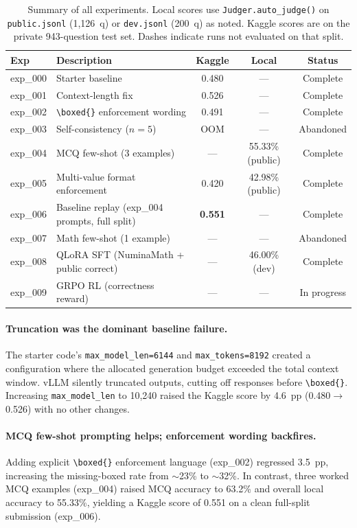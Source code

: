 \documentclass{article}
\begin{document}
\begin{table}[h]
  \caption{Summary of all experiments. Local scores use \texttt{Judger.auto\_judge()} on \texttt{public.jsonl} (1,126~q) or \texttt{dev.jsonl} (200~q) as noted. Kaggle scores are on the private 943-question test set. Dashes indicate runs not evaluated on that split.}
  \label{tab:results}
  \centering
  \begin{tabular}{llccc}
    \toprule
    Exp & Description & Kaggle & Local & Status \\
    \midrule
    exp\_000 & Starter baseline & 0.480 & --- & Complete \\
    exp\_001 & Context-length fix & 0.526 & --- & Complete \\
    exp\_002 & \verb|\boxed{}| enforcement wording & 0.491 & --- & Complete \\
    exp\_003 & Self-consistency ($n{=}5$) & OOM & --- & Abandoned \\
    exp\_004 & MCQ few-shot (3 examples) & --- & 55.33\% (public) & Complete \\
    exp\_005 & Multi-value format enforcement & 0.420 & 42.98\% (public) & Complete \\
    exp\_006 & Baseline replay (exp\_004 prompts, full split) & \textbf{0.551} & --- & Complete \\
    exp\_007 & Math few-shot (1 example) & --- & --- & Abandoned \\
    exp\_008 & QLoRA SFT (NuminaMath + public correct) & --- & 46.00\% (dev) & Complete \\
    exp\_009 & GRPO RL (correctness reward) & --- & --- & In progress \\
    \bottomrule
  \end{tabular}
\end{table}

\paragraph{Truncation was the dominant baseline failure.}
The starter code's \texttt{max\_model\_len=6144} and \texttt{max\_tokens=8192} created a configuration where the allocated generation budget exceeded the total context window. vLLM silently truncated outputs, cutting off responses before \verb|\boxed{}|. Increasing \texttt{max\_model\_len} to 10,240 raised the Kaggle score by 4.6~pp (0.480$\to$0.526) with no other changes.

\paragraph{MCQ few-shot prompting helps; enforcement wording backfires.}
Adding explicit \verb|\boxed{}| enforcement language (exp\_002) regressed 3.5~pp, increasing the missing-boxed rate from ${\sim}$23\% to ${\sim}$32\%. In contrast, three worked MCQ examples (exp\_004) raised MCQ accuracy to 63.2\% and overall local accuracy to 55.33\%, yielding a Kaggle score of 0.551 on a clean full-split submission (exp\_006).
\end{document}
